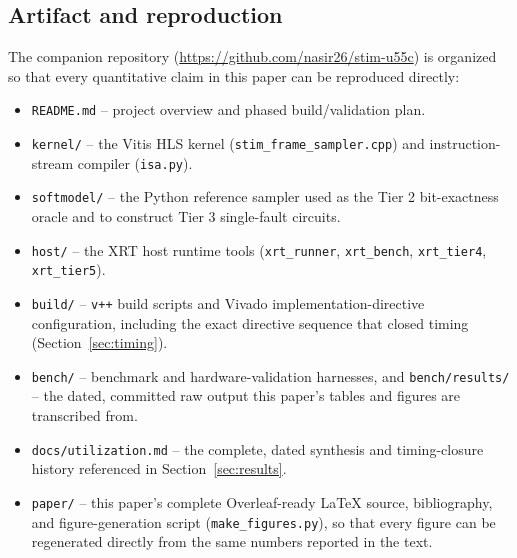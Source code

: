 \documentclass[pdflatex,sn-basic]{sn-jnl}
\begin{document}
\begin{appendices}

\section{Artifact and reproduction}\label{sec:availability}

The companion repository (\url{https://github.com/nasir26/stim-u55c}) is organized so that every quantitative claim in this paper can be reproduced directly:

\begin{itemize}
\item \texttt{README.md} -- project overview and phased build/validation plan.
\item \texttt{kernel/} -- the Vitis HLS kernel (\texttt{stim\_frame\_sampler.cpp}) and instruction-stream compiler (\texttt{isa.py}).
\item \texttt{softmodel/} -- the Python reference sampler used as the Tier 2 bit-exactness oracle and to construct Tier 3 single-fault circuits.
\item \texttt{host/} -- the XRT host runtime tools (\texttt{xrt\_runner}, \texttt{xrt\_bench}, \texttt{xrt\_tier4}, \texttt{xrt\_tier5}).
\item \texttt{build/} -- \texttt{v++} build scripts and Vivado implementation-directive configuration, including the exact directive sequence that closed timing (Section~\ref{sec:timing}).
\item \texttt{bench/} -- benchmark and hardware-validation harnesses, and \texttt{bench/results/} -- the dated, committed raw output this paper's tables and figures are transcribed from.
\item \texttt{docs/utilization.md} -- the complete, dated synthesis and timing-closure history referenced in Section~\ref{sec:results}.
\item \texttt{paper/} -- this paper's complete Overleaf-ready \LaTeX{} source, bibliography, and figure-generation script (\texttt{make\_figures.py}), so that every figure can be regenerated directly from the same numbers reported in the text.
\end{itemize}

\end{appendices}


\end{document}
